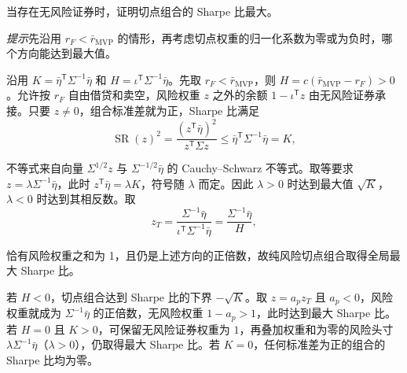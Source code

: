 \par\noindent\begin{minipage}{\linewidth}
\begin{problem}
 当存在无风险证券时，证明切点组合的 Sharpe 比最大。
\par\textit{提示}\quad 先沿用 $r_F<\bar r_{\mathrm{MVP}}$ 的情形，再考虑切点权重的归一化系数为零或为负时，哪个方向能达到最大值。
\end{problem}
\end{minipage}\par
{}
\begin{solution}[label-content={证明},blank-type=manual,blank-vsep=7\baselineskip]
沿用 $K=\bar\eta^{\mathsf T}\Sigma^{-1}\bar\eta$ 和 $H=\iota^{\mathsf T}\Sigma^{-1}\bar\eta$。先取 $r_F<\bar r_{\mathrm{MVP}}$，则 $H=c(\bar r_{\mathrm{MVP}}-r_F)>0$。允许按 $r_F$ 自由借贷和卖空，风险权重 $z$ 之外的余额 $1-\iota^{\mathsf T}z$ 由无风险证券承接。只要 $z\ne0$，组合标准差就为正，Sharpe 比满足
\[
 \operatorname{SR}(z)^2
 =\frac{(z^{\mathsf T}\bar\eta)^2}{z^{\mathsf T}\Sigma z}
 \le\bar\eta^{\mathsf T}\Sigma^{-1}\bar\eta=K,
\]

不等式来自向量 $\Sigma^{1/2}z$ 与 $\Sigma^{-1/2}\bar\eta$ 的 Cauchy--Schwarz 不等式。取等要求 $z=\lambda\Sigma^{-1}\bar\eta$，此时 $z^{\mathsf T}\bar\eta=\lambda K$，符号随 $\lambda$ 而定。因此 $\lambda>0$ 时达到最大值 $\sqrt K$，$\lambda<0$ 时达到其相反数。取
\[
 z_T=\frac{\Sigma^{-1}\bar\eta}{\iota^{\mathsf T}\Sigma^{-1}\bar\eta}
     =\frac{\Sigma^{-1}\bar\eta}{H},
\]

恰有风险权重之和为 1，且仍是上述方向的正倍数，故纯风险切点组合取得全局最大 Sharpe 比。

若 $H<0$，切点组合达到 Sharpe 比的下界 $-\sqrt K$。取 $z=a_pz_T$ 且 $a_p<0$，风险权重就成为 $\Sigma^{-1}\bar\eta$ 的正倍数，无风险权重 $1-a_p>1$，此时达到最大 Sharpe 比。若 $H=0$ 且 $K>0$，可保留无风险证券权重为 $1$，再叠加权重和为零的风险头寸 $\lambda\Sigma^{-1}\bar\eta$（$\lambda>0$），仍取得最大 Sharpe 比。若 $K=0$，任何标准差为正的组合的 Sharpe 比均为零。\qedhere
\end{solution}

